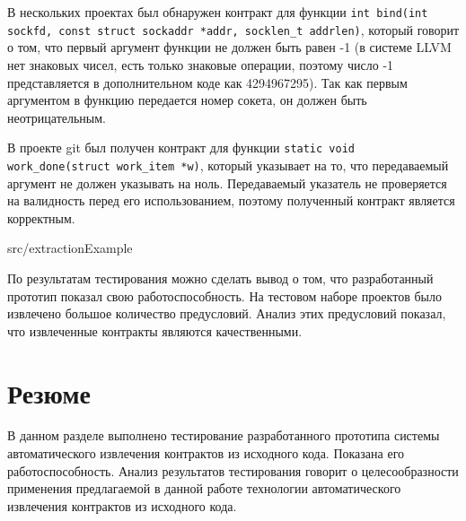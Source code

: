В нескольких проектах был обнаружен контракт для функции \texttt{int bind(int sockfd, const struct sockaddr *addr, socklen_t addrlen)}, который говорит о том, что первый аргумент функции не должен быть равен -1 (в системе LLVM нет знаковых чисел, есть только знаковые операции, поэтому число -1 представляется в дополнительном коде как 4294967295). Так как первым аргументом в функцию передается номер сокета, он должен быть неотрицательным.

В проекте git был получен контракт для функции \texttt{static void work_done(struct work_item *w)}, который указывает на то, что передаваемый аргумент не должен указывать на ноль. Передаваемый указатель не проверяется на валидность перед его использованием, поэтому полученный контракт является корректным.

{src/extractionExample}

По результатам тестирования можно сделать вывод о том, что разработанный прототип показал свою работоспособность. На тестовом наборе проектов было извлечено большое количество предусловий. Анализ этих предусловий показал, что извлеченные контракты являются качественными.

\section{Резюме}
В данном разделе выполнено тестирование разработанного прототипа системы автоматического извлечения контрактов из исходного кода. Показана его работоспособность. Анализ результатов тестирования говорит о целесообразности применения предлагаемой в данной работе технологии автоматического извлечения контрактов из исходного кода.